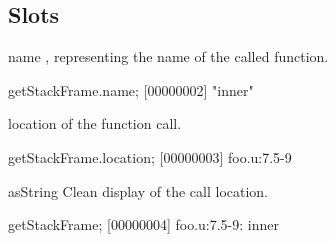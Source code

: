 \subsection{Slots}

\begin{urbiscriptapi}
\item[name] , representing the name of the called
  function.
\begin{urbiscript}
getStackFrame.name;
[00000002] "inner"
\end{urbiscript}

\item[location]  of the function call.
\begin{urbiscript}
getStackFrame.location;
[00000003] foo.u:7.5-9
\end{urbiscript}

\item[asString] Clean display of the call location.
\begin{urbiscript}
getStackFrame;
[00000004] foo.u:7.5-9: inner
\end{urbiscript}

\end{urbiscriptapi}


